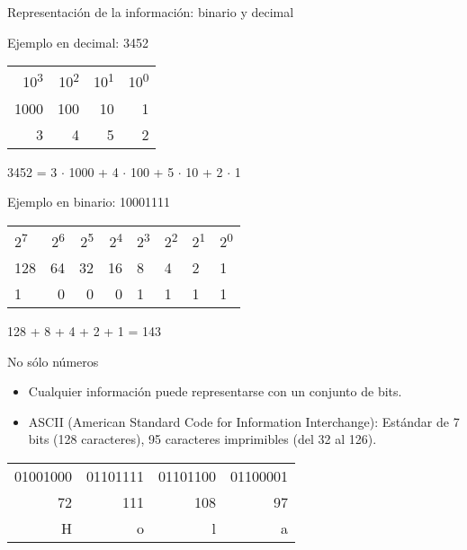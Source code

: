 \documentclass[xcolor={usenames,svgnames,dvipsnames}, aspectratio=169]{beamer}
\begin{document}
\begin{frame}[label={sec:org0bdab1b}]{Representación de la información: binario y decimal}
\begin{block}{Ejemplo en decimal: 3452}
\begin{center}
\begin{tabular}{rrrr}
10\textsuperscript{3} & 10\textsuperscript{2} & 10\textsuperscript{1} & 10\textsuperscript{0}\\
1000 & 100 & 10 & 1\\
\hline
3 & 4 & 5 & 2\\
\end{tabular}
\end{center}

\begin{center}
3452 = 3 \(\cdot\) 1000 + 4 \(\cdot\) 100 + 5 \(\cdot\) 10 + 2 \(\cdot\) 1
\end{center}
\end{block}


\begin{block}{Ejemplo en binario: 10001111}
\begin{center}
\begin{tabular}{lrrrllll}
2\textsuperscript{7} & 2\textsuperscript{6} & 2\textsuperscript{5} & 2\textsuperscript{4} & 2\textsuperscript{3} & 2\textsuperscript{2} & 2\textsuperscript{1} & 2\textsuperscript{0}\\
\alert{128} & 64 & 32 & 16 & \alert{8} & \alert{4} & \alert{2} & \alert{1}\\
\hline
\alert{1} & 0 & 0 & 0 & \alert{1} & \alert{1} & \alert{1} & \alert{1}\\
\end{tabular}
\end{center}

\begin{center}
128 + 8 + 4 + 2 + 1 = 143
\end{center}
\end{block}
\end{frame}

\begin{frame}[label={sec:org8d90c69}]{No sólo números}
\begin{itemize}
\item Cualquier información puede representarse con un conjunto de bits.

\item ASCII (American Standard Code for Information Interchange): Estándar de 7 bits (128 caracteres), 95 caracteres imprimibles (del 32 al 126).
\end{itemize}

\begin{block}{}
\begin{center}
\begin{tabular}{rrrr}
01001000 & 01101111 & 01101100 & 01100001\\
72 & 111 & 108 & 97\\
\LARGE       H & \LARGE       o & \LARGE l & \LARGE a\\
\end{tabular}
\end{center}
\end{block}
\end{frame}
\end{document}
